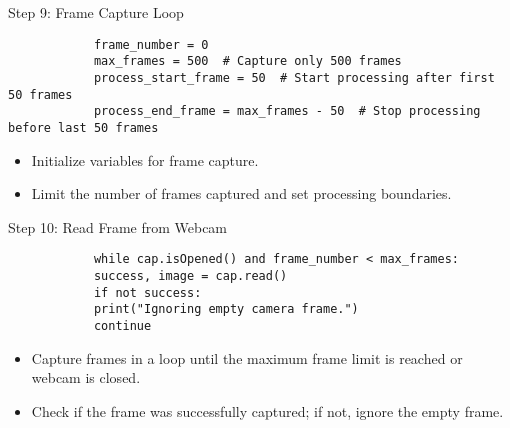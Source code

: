 \documentclass{beamer}
\begin{document}
	\begin{frame}[fragile]{Step 9: Frame Capture Loop}
		\tiny
		\begin{verbatim}
			frame_number = 0
			max_frames = 500  # Capture only 500 frames
			process_start_frame = 50  # Start processing after first 50 frames
			process_end_frame = max_frames - 50  # Stop processing before last 50 frames
		\end{verbatim}
		\begin{itemize}
			\item Initialize variables for frame capture.
			\item Limit the number of frames captured and set processing boundaries.
		\end{itemize}
	\end{frame}
	
	\begin{frame}[fragile]{Step 10: Read Frame from Webcam}
		\tiny
		\begin{verbatim}
			while cap.isOpened() and frame_number < max_frames:
			success, image = cap.read()
			if not success:
			print("Ignoring empty camera frame.")
			continue
		\end{verbatim}
		\begin{itemize}
			\item Capture frames in a loop until the maximum frame limit is reached or webcam is closed.
			\item Check if the frame was successfully captured; if not, ignore the empty frame.
		\end{itemize}
	\end{frame}
	
\end{document}
